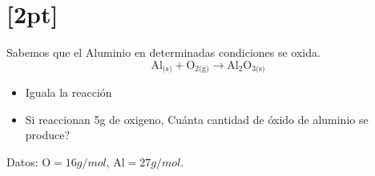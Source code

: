 \documentclass[11pt]{article}
\begin{document}
  \section{[2pt]}
  Sabemos que el Aluminio en determinadas condiciones se oxida.
  \[
    \text{Al}_{\text{(s)}} + \text{O}_{\text{2(g)}} \rightarrow \text{Al}_{2}\text{O}_{\text{3(s)}}
  \]
  \begin{itemize}
  \item Iguala la reacción
    \item Si reaccionan 5g de oxigeno, Cuánta cantidad de óxido de aluminio se produce?
    \end{itemize}
          Datos: \(\text{O} = 16g/mol \text{, Al} = 27g/mol \).
\end{document}
